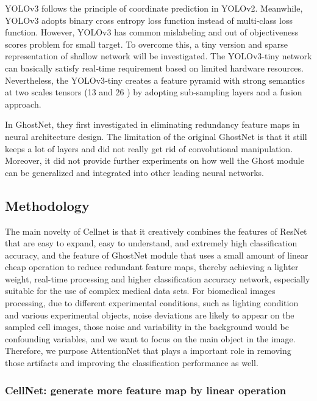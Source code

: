 YOLOv3 \cite{b33} follows the principle of coordinate prediction in YOLOv2. 
Meanwhile, YOLOv3 adopts binary cross entropy loss function instead of multi‐class loss function\cite{b18}. However, YOLOv3 has common mislabeling and out of objectiveness scores problem for small target. To overcome this, a tiny version and sparse representation of shallow network will be investigated. The YOLOv3‐tiny network can basically satisfy real‐time requirement based on limited hardware resources. Nevertheless, the YOLOv3‐tiny creates a feature pyramid with strong semantics at two scales tensors (13  and 26 ) by adopting sub-sampling layers and a fusion approach\cite{b18}.

In GhostNet\cite{b19}, they first investigated in eliminating redundancy feature maps in neural architecture design. The limitation of the original GhostNet \cite{b19} is that it still keeps a lot of layers and did not really get rid of convolutional manipulation. Moreover, it did not provide further experiments on how well the Ghost module can be generalized and integrated into other leading neural networks.

\subsection{Methodology}
The main novelty of Cellnet is that it creatively combines the features of ResNet\cite{b20} that are easy to expand, easy to understand, and extremely high classification accuracy, and the feature of GhostNet\cite{b19} module that uses a small amount of linear cheap operation to reduce  redundant feature maps, thereby achieving a lighter weight, real-time processing and higher classification accuracy network, especially suitable for the use of complex medical data sets.
For biomedical images processing, due to different experimental conditions, such as lighting condition and various  experimental objects, noise deviations are likely to appear on the sampled cell images\cite{b6}\cite{b7}, those noise and variability in the background would be confounding variables, and we want to focus on the main object in the image. Therefore, we purpose AttentionNet that plays a important role in removing those artifacts and improving the  classification performance as well.

\subsubsection{CellNet: generate more feature map by linear operation}

